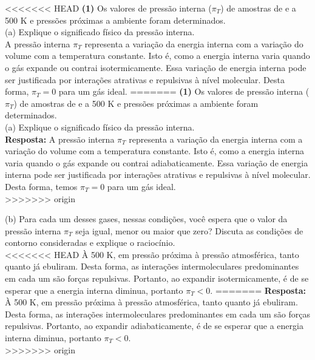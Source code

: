 <<<<<<< HEAD
\textbf{(1)} Os valores de pressão interna (\(\pi_T\)) de amostras de  e
 a 500 K e pressões próximas a ambiente foram determinados.\\

(a) Explique o significado físico da pressão interna.\\

   A pressão interna \( \pi_T \) representa a variação da energia interna com a
   variação do volume com a temperatura constante. Isto é, como a energia
   interna varia quando o gás expande ou contrai isotermicamente. Essa variação
   de energia interna pode ser justificada por interações atrativas e repulsivas
   à nível molecular. Desta forma, \( \pi_T = 0 \) para um gás ideal. 
=======
\textbf{(1)} Os valores de pressão interna (\(\pi_T\)) de amostras de
 e  a 500 K e pressões próximas a ambiente foram
determinados.\\

(a) Explique o significado físico da pressão interna.\\

   \textbf{Resposta:} A pressão interna \( \pi_T \) representa a variação da
   energia interna com a variação do volume com a temperatura constante. Isto é,
   como a energia interna varia quando o gás expande ou contrai adiabaticamente.
   Essa variação de energia interna pode ser justificada por interações
   atrativas e repulsivas à nível molecular. Desta forma, temos \( \pi_T = 0 \) para
   um gás ideal.\\ 
>>>>>>> origin

(b) Para cada um desses gases, nessas condições, você espera que o valor da
pressão interna \(\pi_T\)  seja igual, menor ou maior que zero? Discuta as
condições de contorno consideradas e explique o raciocínio.\\

<<<<<<< HEAD
    À 500 K, em pressão próxima à pressão atmosférica, tanto  quanto
     já ebuliram. Desta forma, as
    interações intermoleculares predominantes em cada um são forças repulsivas.
    Portanto, ao expandir isotermicamente, é de se esperar que a energia interna
    diminua, portanto \( \pi_T < 0 \).
=======
    \textbf{Resposta:} À 500 K, em pressão próxima à pressão atmosférica, tanto
     quanto  já ebuliram. Desta forma, as interações
    intermoleculares predominantes em cada um são forças repulsivas.  Portanto,
    ao expandir adiabaticamente, é de se esperar que a energia interna diminua,
    portanto \( \pi_T < 0 \).\\
>>>>>>> origin
